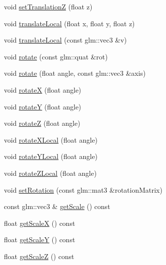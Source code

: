 \begin{DoxyCompactItemize}
void \mbox{\hyperlink{classec_1_1_transform3_d_aeddca7f4f74afd8394810222684fad30}{set\+TranslationZ}} (float z)
\item 
void \mbox{\hyperlink{classec_1_1_transform3_d_aa32ee07603a9531e77b189185cbd40e4}{translate\+Local}} (float x, float y, float z)
\item 
void \mbox{\hyperlink{classec_1_1_transform3_d_a8769dc2eb4f1cd467d8e39c85decdd10}{translate\+Local}} (const glm\+::vec3 \&v)
\item 
void \mbox{\hyperlink{classec_1_1_transform3_d_a24885ce6a9f002a00f7c263e4076ea6b}{rotate}} (const glm\+::quat \&rot)
\item 
void \mbox{\hyperlink{classec_1_1_transform3_d_ac9787bc7e772a5ef4f9a7ed36be1ae10}{rotate}} (float angle, const glm\+::vec3 \&axis)
\item 
void \mbox{\hyperlink{classec_1_1_transform3_d_a620c1729b027b54d0cabe03a8cdc9253}{rotateX}} (float angle)
\item 
void \mbox{\hyperlink{classec_1_1_transform3_d_a3e365a26befa6aabeb2e0b3ca680dd4f}{rotateY}} (float angle)
\item 
void \mbox{\hyperlink{classec_1_1_transform3_d_afb339cf9f8c44fa6db954eb82af63c5b}{rotateZ}} (float angle)
\item 
void \mbox{\hyperlink{classec_1_1_transform3_d_a7124a324cea1d06b438248003d332ee2}{rotate\+X\+Local}} (float angle)
\item 
void \mbox{\hyperlink{classec_1_1_transform3_d_abfc79987e5fc4c805c5ff479d2c8b624}{rotate\+Y\+Local}} (float angle)
\item 
void \mbox{\hyperlink{classec_1_1_transform3_d_a9079ea3fc1c171f2e70fb489c804fc52}{rotate\+Z\+Local}} (float angle)
\item 
void \mbox{\hyperlink{classec_1_1_transform3_d_adc80d3f045c44c02bec2f2c1db2144db}{set\+Rotation}} (const glm\+::mat3 \&rotation\+Matrix)
\item 
const glm\+::vec3 \& \mbox{\hyperlink{classec_1_1_transform3_d_ab5f0e26d19bbb99a4624784d3024e654}{get\+Scale}} () const
\item 
float \mbox{\hyperlink{classec_1_1_transform3_d_a7ecc00577cd57f15ed63926a712cdcb1}{get\+ScaleX}} () const
\item 
float \mbox{\hyperlink{classec_1_1_transform3_d_a99763688e60bc36134390327344f5df0}{get\+ScaleY}} () const
\item 
float \mbox{\hyperlink{classec_1_1_transform3_d_ad79cc7092172c384e46b426059928672}{get\+ScaleZ}} () const
\item 

\end{DoxyCompactItemize}

